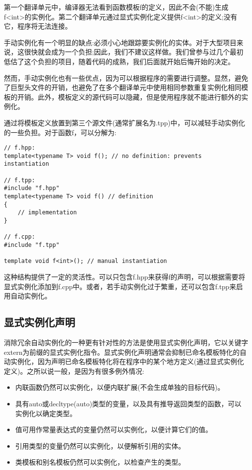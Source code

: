 第一个翻译单元中，编译器无法看到函数模板f的定义，因此不会(不能)生成f<int>的实例化。第二个翻译单元通过显式实例化定义提供f<int>的定义;没有它，程序将无法连接。

手动实例化有一个明显的缺点:必须小心地跟踪要实例化的实体。对于大型项目来说，这很快就会成为一个负担;因此，我们不建议这样做。我们曾参与过几个最初低估了这个负担的项目，随着代码的成熟，我们后面就开始后悔开始的决定。

然而，手动实例化也有一些优点，因为可以根据程序的需要进行调整。显然，避免了巨型头文件的开销，也避免了在多个翻译单元中使用相同参数重复实例化相同模板的开销。此外，模板定义的源代码可以隐藏，但是使用程序就不能进行额外的实例化。

通过将模板定义放置到第三个源文件(通常扩展名为.tpp)中，可以减轻手动实例化的一些负担。对于函数f，可以分解为:

\begin{lstlisting}[style=styleCXX]
// f.hpp:
template<typename T> void f(); // no definition: prevents instantiation

// f.tpp:
#include "f.hpp"
template<typename T> void f() // definition
{
	// implementation
}

// f.cpp:
#include "f.tpp"

template void f<int>(); // manual instantiation
\end{lstlisting}

这种结构提供了一定的灵活性。可以只包含f.hpp来获得f的声明，可以根据需要将显式实例化添加到f.cpp中。或者，若手动实例化过于繁重，还可以包含f.tpp来启用自动实例化。

\subsection{显式实例化声明}

消除冗余自动实例化的一种更有针对性的方法是使用显式实例化声明，它以关键字extern为前缀的显式实例化指令。显式实例化声明通常会抑制已命名模板特化的自动实例化，因为声明已命名模板特化将在程序中的某个地方定义(通过显式实例化定义)。之所以说一般，是因为有很多例外情况:

\begin{itemize}
\item 
内联函数仍然可以实例化，以便内联扩展(不会生成单独的目标代码)。

\item 
具有auto或decltype(auto)类型的变量，以及具有推导返回类型的函数，可以实例化以确定类型。

\item 
值可用作常量表达式的变量仍然可以实例化，以便计算它们的值。

\item 
引用类型的变量仍然可以实例化，以便解析引用的实体。

\item 
类模板和别名模板仍然可以实例化，以检查产生的类型。
\end{itemize}

